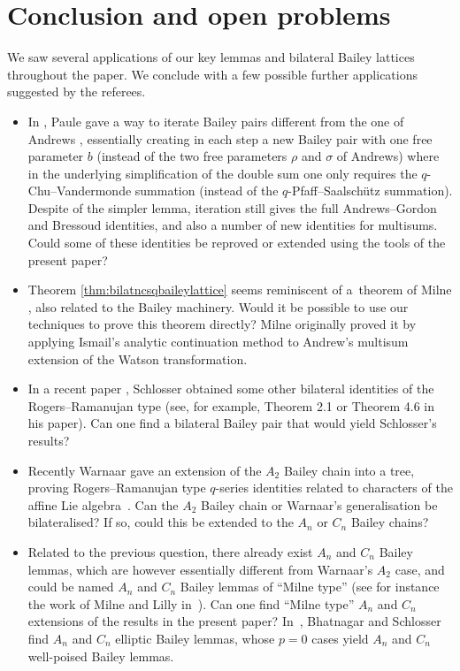 \documentclass[pdftex]{sigma}
\numberwithin{equation}{section}
\begin{document}
\section{Conclusion and open problems}
We saw several applications of our key lemmas and bilateral Bailey lattices throughout the paper. We conclude with a few possible further applications suggested by the referees.
\begin{itemize}\itemsep=0pt
\item In \cite{P}, Paule gave a way to iterate Bailey pairs different from the one of Andrews \cite{A1}, essentially creating in each step a
new Bailey pair with one free parameter $b$ (instead
of the two free parameters $\rho$ and $\sigma$ of Andrews) where in the underlying
simplification of the double sum one only requires the $q$-Chu--Vandermonde
summation (instead of the $q$-Pfaff--Saalsch\"utz summation). Despite of the simpler lemma, iteration still gives the full Andrews--Gordon and
Bressoud identities, and also a number of new identities for multisums. Could some of these identities be reproved or extended using the tools of the present paper?

\item Theorem \ref{thm:bilatncsqbaileylattice} seems reminiscent of a~theorem of Milne \cite[Theorem 1.7]{Mil80}, also related to the Bailey machinery. Would it be possible to use our techniques to prove this theorem directly? Milne originally proved it by applying Ismail's analytic continuation method to Andrew's multisum extension of the Watson transformation.

\item In a recent paper \cite{Sch23}, Schlosser obtained some other bilateral identities of the Rogers--Ramanujan type (see, for example, Theorem 2.1 or Theorem
4.6 in his paper). Can one find a bilateral Bailey pair that would yield Schlosser's results?

\item Recently Warnaar \cite{W23} gave an extension of the $A_2$ Bailey chain into a tree, proving Rogers--Ramanujan type $q$-series identities related to characters of the affine Lie algebra~. Can the $A_2$ Bailey chain or Warnaar's generalisation be bilateralised? If so, could this be extended to the $A_n$ or $C_n$ Bailey chains?

\item Related to the previous question, there already exist $A_n$ and $C_n$ Bailey lemmas, which are however essentially different from Warnaar's $A_2$ case, and could be named $A_n$ and $C_n$ Bailey lemmas of ``Milne type'' (see for instance the work of Milne and Lilly in~\cite{ML92, ML93}). Can one find ``Milne type'' $A_n$ and $C_n$ extensions of the results in the present paper? In~\cite{BS}, Bhatnagar and Schlosser find $A_n$ and $C_n$ elliptic Bailey lemmas, whose $p=0$ cases yield $A_n$ and $C_n$ well-poised Bailey lemmas.
\end{itemize}
\end{document}
